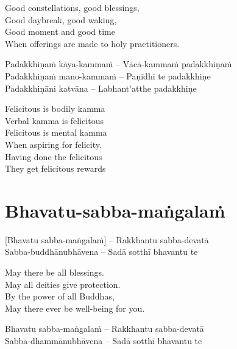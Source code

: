 \begin{english-verses}
  Good constellations, good blessings,\\
  Good daybreak, good waking,\\
  Good moment and good time\\
  When offerings are made to holy practitioners.
\end{english-verses}

Padakkhiṇaṁ kāya-kammaṁ – Vācā-kammaṁ padakkhiṇaṁ\\
Padakkhiṇaṁ mano-kammaṁ – Paṇīdhi te padakkhiṇe\hyperlink{endnote127-appendix}{\hypertarget{endnote127-body}{}}\\
Padakkhiṇāni katvāna – Labhant'atthe padakkhiṇe

\begin{english-verses}
  Felicitous is bodily kamma\\
  Verbal kamma is felicitous\\
  Felicitous is mental kamma\\
  When aspiring for felicity.\\
  Having done the felicitous\\
  They get felicitous rewards
\end{english-verses}

\suttaRef{[AN 3.155]}

\section{Bhavatu-sabba-maṅgalaṁ}
\label{bhavatu-sabba-mangalam}

\vspace{-0.6em}

[Bhavatu sabba-maṅgalaṁ] – Rakkhantu sabba-devatā\\
Sabba-buddhānubhāvena – Sadā sotthī bhavantu te

\begin{english-verses}
  May there be all blessings.\\
  May all deities give protection.\\
  By the power of all Buddhas,\\
  May there ever be well-being for you.
\end{english-verses}

Bhavatu sabba-maṅgalaṁ – Rakkhantu sabba-devatā\\
Sabba-dhammānubhāvena – Sadā sotthī bhavantu te

